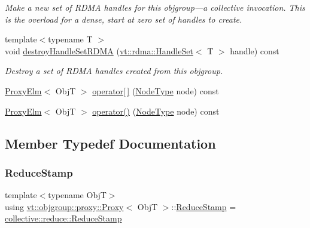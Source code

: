 \begin{DoxyCompactItemize}
\begin{DoxyCompactList}\small\item\em Make a new set of R\+D\+MA handles for this objgroup---a collective invocation. This is the overload for a dense, start at zero set of handles to create. \end{DoxyCompactList}\item 
{\footnotesize template$<$typename T $>$ }\\void \hyperlink{structvt_1_1objgroup_1_1proxy_1_1_proxy_a9211f7a2459cfcb28f8b90dbdc77c8bc}{destroy\+Handle\+Set\+R\+D\+MA} (\hyperlink{structvt_1_1rdma_1_1_handle_set}{vt\+::rdma\+::\+Handle\+Set}$<$ T $>$ handle) const
\begin{DoxyCompactList}\small\item\em Destroy a set of R\+D\+MA handles created from this objgroup. \end{DoxyCompactList}\item 
\hyperlink{structvt_1_1objgroup_1_1proxy_1_1_proxy_elm}{Proxy\+Elm}$<$ ObjT $>$ \hyperlink{structvt_1_1objgroup_1_1proxy_1_1_proxy_a00a267a8730fe2547776ff0136ea3895}{operator\mbox{[}$\,$\mbox{]}} (\hyperlink{namespacevt_a866da9d0efc19c0a1ce79e9e492f47e2}{Node\+Type} node) const
\item 
\hyperlink{structvt_1_1objgroup_1_1proxy_1_1_proxy_elm}{Proxy\+Elm}$<$ ObjT $>$ \hyperlink{structvt_1_1objgroup_1_1proxy_1_1_proxy_ac290e4d37f05dc1183c205a1b9ee44cd}{operator()} (\hyperlink{namespacevt_a866da9d0efc19c0a1ce79e9e492f47e2}{Node\+Type} node) const
\end{DoxyCompactItemize}


\subsection{Member Typedef Documentation}
\mbox{\label{structvt_1_1objgroup_1_1proxy_1_1_proxy_a337be4c20cf11ff6477c7a66208cc909}} 
\subsubsection{\texorpdfstring{Reduce\+Stamp}{ReduceStamp}}
{\footnotesize\ttfamily template$<$typename ObjT$>$ \\
using \hyperlink{structvt_1_1objgroup_1_1proxy_1_1_proxy}{vt\+::objgroup\+::proxy\+::\+Proxy}$<$ ObjT $>$\+::\hyperlink{structvt_1_1objgroup_1_1proxy_1_1_proxy_a337be4c20cf11ff6477c7a66208cc909}{Reduce\+Stamp} =  \hyperlink{namespacevt_1_1collective_1_1reduce_a7b7cb3021ac5654d92825d9fab0250b2}{collective\+::reduce\+::\+Reduce\+Stamp}}



